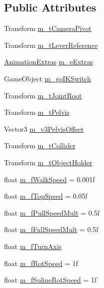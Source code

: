 \subsection*{Public Attributes}
\begin{DoxyCompactItemize}
\item 
Transform \mbox{\hyperlink{class_animal_a67b099ba034805dad5ee5cc45481cdf1}{m\+\_\+t\+Camera\+Pivot}}
\item 
Transform \mbox{\hyperlink{class_animal_a960e8ba99fbe90ef77f4937a60c473e8}{m\+\_\+t\+Lever\+Reference}}
\item 
\mbox{\hyperlink{class_animation_extras}{Animation\+Extras}} \mbox{\hyperlink{class_animal_a3e903279d776c821c7e699847fe06cf5}{m\+\_\+e\+Extras}}
\item 
Game\+Object \mbox{\hyperlink{class_animal_a4949db860eac422ce2a1a3df77f84bc5}{m\+\_\+go\+I\+K\+Switch}}
\item 
Transform \mbox{\hyperlink{class_animal_a7e09edf484465463e391503fc00d53e0}{m\+\_\+t\+Joint\+Root}}
\item 
Transform \mbox{\hyperlink{class_animal_a1fa3aebf72a7982519c84f4fff4c2fe6}{m\+\_\+t\+Pelvis}}
\item 
Vector3 \mbox{\hyperlink{class_animal_a8d925d74519bd6da8927346e43371576}{m\+\_\+v3\+Pelvis\+Offset}}
\item 
Transform \mbox{\hyperlink{class_animal_afbea823db5efa979305809e5a44f0660}{m\+\_\+t\+Collider}}
\item 
Transform \mbox{\hyperlink{class_animal_a14776da7c67e6a28ea9ac2145d34c815}{m\+\_\+t\+Object\+Holder}}
\item 
float \mbox{\hyperlink{class_animal_a4e411bb9775139ae49634dba20781d64}{m\+\_\+f\+Walk\+Speed}} = 0.\+001f
\item 
float \mbox{\hyperlink{class_animal_a66e141cf619fde63384c1759988c95ca}{m\+\_\+f\+Top\+Speed}} = 0.\+05f
\item 
float \mbox{\hyperlink{class_animal_a6dfbab9edf6169464fe9a8344032c28e}{m\+\_\+f\+Pull\+Speed\+Mult}} = 0.\+5f
\item 
float \mbox{\hyperlink{class_animal_a46f6e3823b8f08a423b762437ebc504b}{m\+\_\+f\+Fall\+Speed\+Mult}} = 0.\+5f
\item 
float \mbox{\hyperlink{class_animal_a526af3f4cd5e19f8449ce4a01a4cb65e}{m\+\_\+f\+Turn\+Axis}}
\item 
float \mbox{\hyperlink{class_animal_a2b708fd867ff4c7f87c2b38f3391f4ee}{m\+\_\+f\+Rot\+Speed}} = 1f
\item 
float \mbox{\hyperlink{class_animal_a208c7380adb491ec2cb389c255172262}{m\+\_\+f\+Spline\+Rot\+Speed}} = 1f

\end{DoxyCompactItemize}
